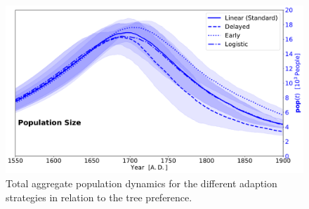 \begin{figure}
	\centering
	\includegraphics[width=1\linewidth]{images/Results/TPref/TPrefAdaption_Population_Size}
	\caption{Total aggregate population dynamics for the different adaption strategies in relation to the tree preference.}
	\label{fig:tprefadaptionpopulationsize}
\end{figure}




%
%





